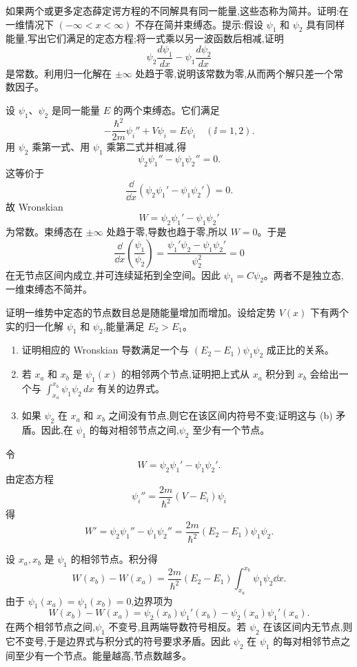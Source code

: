 \begin{question}
如果两个或更多定态薛定谔方程的不同解具有同一能量,这些态称为简并。证明:在一维情况下 $(-\infty<x<\infty)$ 不存在简并束缚态。提示:假设 $\psi_1$ 和 $\psi_2$ 具有同样能量,写出它们满足的定态方程;将一式乘以另一波函数后相减,证明
\[
\psi_2\frac{d\psi_1}{dx}-\psi_1\frac{d\psi_2}{dx}
\]
是常数。利用归一化解在 $\pm\infty$ 处趋于零,说明该常数为零,从而两个解只差一个常数因子。
\begin{solution}
设 $\psi_1$、$\psi_2$ 是同一能量 $E$ 的两个束缚态。它们满足
\[
-\frac{\hbar^2}{2m}\psi_i''+V\psi_i=E\psi_i\quad(\ii=1,2).
\]
用 $\psi_2$ 乘第一式、用 $\psi_1$ 乘第二式并相减,得
\[
\psi_2\psi_1''-\psi_1\psi_2''=0.
\]
这等价于
\[
\frac{\dd}{\dd x}\left(\psi_2\psi_1'-\psi_1\psi_2'\right)=0.
\]
故 Wronskian
\[
W=\psi_2\psi_1'-\psi_1\psi_2'
\]
为常数。束缚态在 $\pm\infty$ 处趋于零,导数也趋于零,所以 $W=0$。于是
\[
\frac{\dd}{\dd x}\left(\frac{\psi_1}{\psi_2}\right)=\frac{\psi_1'\psi_2-\psi_1\psi_2'}{\psi_2^2}=0
\]
在无节点区间内成立,并可连续延拓到全空间。因此 $\psi_1=C\psi_2$。两者不是独立态,一维束缚态不简并。
\end{solution}
\end{question}

\begin{question}
证明一维势中定态的节点数目总是随能量增加而增加。设给定势 $V(x)$ 下有两个实的归一化解 $\psi_1$ 和 $\psi_2$,能量满足 $E_2>E_1$。
\begin{enumerate}
\item 证明相应的 Wronskian 导数满足一个与 $(E_2-E_1)\psi_1\psi_2$ 成正比的关系。
\item 若 $x_a$ 和 $x_b$ 是 $\psi_1(x)$ 的相邻两个节点,证明把上式从 $x_a$ 积分到 $x_b$ 会给出一个与 $\int_{x_a}^{x_b}\psi_1\psi_2\,dx$ 有关的边界式。
\item 如果 $\psi_2$ 在 $x_a$ 和 $x_b$ 之间没有节点,则它在该区间内符号不变;证明这与 (b) 矛盾。因此,在 $\psi_1$ 的每对相邻节点之间,$\psi_2$ 至少有一个节点。
\end{enumerate}
\begin{solution}
令
\[
W=\psi_2\psi_1'-\psi_1\psi_2'.
\]
由定态方程
\[
\psi_i''=\frac{2m}{\hbar^2}(V-E_i)\psi_i
\]
得
\[
W'=\psi_2\psi_1''-\psi_1\psi_2''
=\frac{2m}{\hbar^2}(E_2-E_1)\psi_1\psi_2.
\]

设 $x_a,x_b$ 是 $\psi_1$ 的相邻节点。积分得
\[
W(x_b)-W(x_a)=\frac{2m}{\hbar^2}(E_2-E_1)
\int_{x_a}^{x_b}\psi_1\psi_2\dd x.
\]
由于 $\psi_1(x_a)=\psi_1(x_b)=0$,边界项为
\[
W(x_b)-W(x_a)=\psi_2(x_b)\psi_1'(x_b)-\psi_2(x_a)\psi_1'(x_a).
\]
在两个相邻节点之间,$\psi_1$ 不变号,且两端导数符号相反。若 $\psi_2$ 在该区间内无节点,则它不变号,于是边界式与积分式的符号要求矛盾。因此 $\psi_2$ 在 $\psi_1$ 的每对相邻节点之间至少有一个节点。能量越高,节点数越多。
\end{solution}
\end{question}


